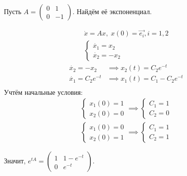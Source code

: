 \begin{exmp}
    Пусть 
    $A = \left( \begin{matrix}
        0 & 1 \\
        0 & -1
    \end{matrix} \right)$.
    Найдём её экспоненциал.

    \begin{gather*}
        \dot{x} = Ax, \; x(0) = \vec{e_i}, i = 1, 2 \\
        \begin{cases}
            \dot{x_1} = x_2 \\
            \dot{x_2} = -x_2
        \end{cases}
    \end{gather*}
    \begin{align*}
        \dot{x_2} = -x_2 &\implies x_2(t) = C_2 e^{-t} \\
        \dot{x_1} = C_2 e^{-t} &\implies x_1(t) = C_1 - C_2 e^{-t}\\
    \end{align*}
    Учтём начальные условия:
    \begin{align*}
        \begin{cases}
            x_1(0) = 1 \\
            x_2(0) = 0 
        \end{cases} \implies
        \begin{cases}
            C_1 = 1 \\
            C_2 = 0 
        \end{cases} \\
        \begin{cases}
            x_1(0) = 0 \\
            x_2(0) = 1
        \end{cases} \implies
        \begin{cases}
            C_1 = 1 \\
            C_2 = 1
        \end{cases}
    \end{align*}

    Значит, $e^{tA} = \left( \begin{matrix}
        1 & 1-e^{-t} \\
        0 & e^{-t}
    \end{matrix} \right)$.
\end{exmp}

